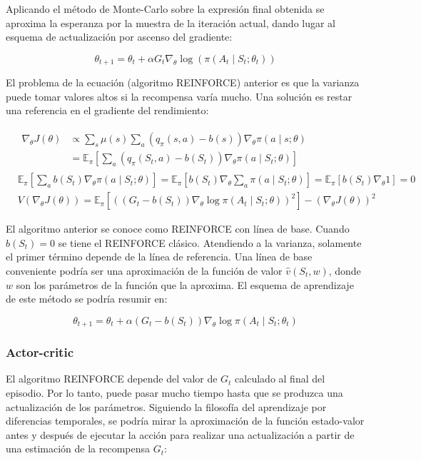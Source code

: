 \documentclass[11pt,a4paper]{article}
\begin{document}
		Aplicando el método de Monte-Carlo sobre la expresión final obtenida se aproxima la esperanza por la muestra de la iteración actual, dando lugar al esquema de actualización por ascenso del gradiente:
		
		\begin{equation}
		\theta_{t+1} = \theta_t + \alpha G_t \nabla_\theta \log(\pi(A_t \mid S_t ; \theta_t))
		\end{equation}
		
		El problema de la ecuación (algoritmo REINFORCE) anterior es que la varianza puede tomar valores altos si la recompensa varía mucho. Una solución es restar una referencia en el gradiente del rendimiento:
		
		\begin{align}
		&\begin{aligned}
		\nabla_\theta J(\theta) &\propto \sum_s \mu(s) \sum_a \left( q_\pi(s, a) - b(s) \right) \nabla_\theta \pi(a \mid s; \theta) \\
		&= \mathbb{E}_{\pi}\left[ \sum_a \left( q_\pi(S_t, a) - b(S_t) \right) \nabla_\theta \pi(a \mid S_t ; \theta) \right]
		\end{aligned} \\
		&\mathbb{E}_{\pi}\left[ \sum_a b(S_t) \nabla_\theta \pi(a \mid S_t ; \theta) \right] = \mathbb{E}_{\pi}\left[ b(S_t) \nabla_\theta \sum_a \pi(a \mid S_t ; \theta) \right] = \mathbb{E}_{\pi}\left[ b(S_t) \nabla_\theta 1 \right] = 0 \\
		&V(\nabla_\theta J(\theta)) = \mathbb{E}_\pi\left[ \left( (G_t - b(S_t)) \nabla_\theta \log \pi(A_t \mid S_t; \theta) \right)^2 \right] - \left( \nabla_\theta J(\theta) \right)^2
		\end{align}
		
		El algoritmo anterior se conoce como REINFORCE con línea de base. Cuando $b(S_t) = 0$ se tiene el REINFORCE clásico. Atendiendo a la varianza, solamente el primer término depende de la línea de referencia. Una línea de base conveniente podría ser una aproximación de la función de valor $\hat{v}(S_t, w)$, donde $w$ son los parámetros de la función que la aproxima. El esquema de aprendizaje de este método se podría resumir en:
		
		\begin{equation}
		\theta_{t+1} = \theta_t + \alpha \left( G_t - b(S_t) \right) \nabla_\theta \log \pi(A_t \mid S_t ; \theta_t)
		\end{equation}
		
		\subsubsection{Actor-critic}
		El algoritmo REINFORCE depende del valor de $G_t$ calculado al final del episodio. Por lo tanto, puede pasar mucho tiempo hasta que se produzca una actualización de los parámetros. Siguiendo la filosofía del aprendizaje por diferencias temporales, se podría mirar la aproximación de la función estado-valor antes y después de ejecutar la acción para realizar una actualización a partir de una estimación de la recompensa $G_t$:
		
\end{document}
